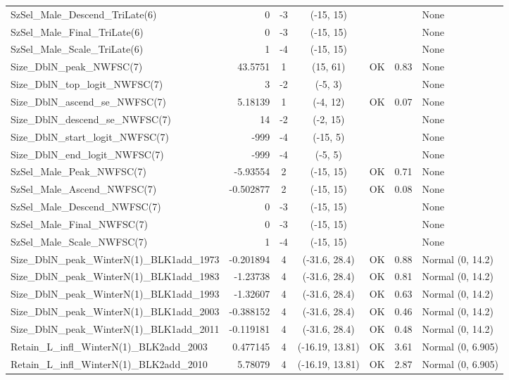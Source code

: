 \documentclass[12pt,]{article}
\begin{document}
\begin{landscape}
\begin{longtable}{lrcccll}
  SzSel\_Male\_Descend\_TriLate(6) & 0 & -3 & (-15, 15) &  &  & None \\ 
  SzSel\_Male\_Final\_TriLate(6) & 0 & -3 & (-15, 15) &  &  & None \\ 
  SzSel\_Male\_Scale\_TriLate(6) & 1 & -4 & (-15, 15) &  &  & None \\ 
  Size\_DblN\_peak\_NWFSC(7) & 43.5751 & 1 & (15, 61) & OK & 0.83 & None \\ 
  Size\_DblN\_top\_logit\_NWFSC(7) & 3 & -2 & (-5, 3) &  &  & None \\ 
  Size\_DblN\_ascend\_se\_NWFSC(7) & 5.18139 & 1 & (-4, 12) & OK & 0.07 & None \\ 
  Size\_DblN\_descend\_se\_NWFSC(7) & 14 & -2 & (-2, 15) &  &  & None \\ 
  Size\_DblN\_start\_logit\_NWFSC(7) & -999 & -4 & (-15, 5) &  &  & None \\ 
  Size\_DblN\_end\_logit\_NWFSC(7) & -999 & -4 & (-5, 5) &  &  & None \\ 
  SzSel\_Male\_Peak\_NWFSC(7) & -5.93554 & 2 & (-15, 15) & OK & 0.71 & None \\ 
  SzSel\_Male\_Ascend\_NWFSC(7) & -0.502877 & 2 & (-15, 15) & OK & 0.08 & None \\ 
  SzSel\_Male\_Descend\_NWFSC(7) & 0 & -3 & (-15, 15) &  &  & None \\ 
  SzSel\_Male\_Final\_NWFSC(7) & 0 & -3 & (-15, 15) &  &  & None \\ 
  SzSel\_Male\_Scale\_NWFSC(7) & 1 & -4 & (-15, 15) &  &  & None \\ 
  Size\_DblN\_peak\_WinterN(1)\_BLK1add\_1973 & -0.201894 & 4 & (-31.6, 28.4) & OK & 0.88 & Normal (0, 14.2) \\ 
  Size\_DblN\_peak\_WinterN(1)\_BLK1add\_1983 & -1.23738 & 4 & (-31.6, 28.4) & OK & 0.81 & Normal (0, 14.2) \\ 
  Size\_DblN\_peak\_WinterN(1)\_BLK1add\_1993 & -1.32607 & 4 & (-31.6, 28.4) & OK & 0.63 & Normal (0, 14.2) \\ 
  Size\_DblN\_peak\_WinterN(1)\_BLK1add\_2003 & -0.388152 & 4 & (-31.6, 28.4) & OK & 0.46 & Normal (0, 14.2) \\ 
  Size\_DblN\_peak\_WinterN(1)\_BLK1add\_2011 & -0.119181 & 4 & (-31.6, 28.4) & OK & 0.48 & Normal (0, 14.2) \\ 
  Retain\_L\_infl\_WinterN(1)\_BLK2add\_2003 & 0.477145 & 4 & (-16.19, 13.81) & OK & 3.61 & Normal (0, 6.905) \\ 
  Retain\_L\_infl\_WinterN(1)\_BLK2add\_2010 & 5.78079 & 4 & (-16.19, 13.81) & OK & 2.87 & Normal (0, 6.905) \\ 

\end{longtable}
\end{landscape}
\end{document}
